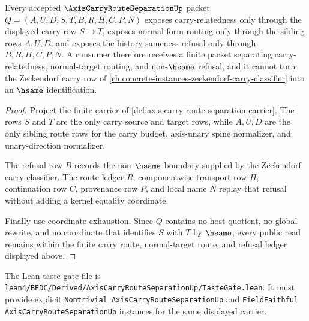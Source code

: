 \begin{theorem}
\label{thm:axis-carry-route-separation-boundary}
Every accepted $\AxisCarryRouteSeparationUp$ packet $Q=(A,U,D,S,T,B,R,H,C,P,N)$ exposes carry-relatedness only through the displayed carry row $S \to T$, exposes normal-form routing only through the sibling rows $A,U,D$, and exposes the history-sameness refusal only through $B,R,H,C,P,N$. A consumer therefore receives a finite packet separating carry-relatedness, normal-target routing, and non-$\hsame$ refusal, and it cannot turn the Zeckendorf carry row of \autoref{ch:concrete-instances-zeckendorf-carry-classifier} into an $\hsame$ identification.
\end{theorem}
\begin{proof}
Project the finite carrier of \autoref{def:axis-carry-route-separation-carrier}. The rows $S$ and $T$ are the only carry source and target rows, while $A,U,D$ are the only sibling route rows for the carry budget, axis-unary spine normalizer, and unary-direction normalizer.

The refusal row $B$ records the non-$\hsame$ boundary supplied by the Zeckendorf carry classifier. The route ledger $R$, componentwise transport row $H$, continuation row $C$, provenance row $P$, and local name $N$ replay that refusal without adding a kernel equality coordinate.

Finally use coordinate exhaustion. Since $Q$ contains no host quotient, no global rewrite, and no coordinate that identifies $S$ with $T$ by $\hsame$, every public read remains within the finite carry route, normal-target route, and refusal ledger displayed above.
\end{proof}



The Lean taste-gate file is \texttt{lean4/BEDC/Derived/AxisCarryRouteSeparationUp/TasteGate.lean}. It must provide explicit \texttt{Nontrivial AxisCarryRouteSeparationUp} and \texttt{FieldFaithful AxisCarryRouteSeparationUp} instances for the same displayed carrier.


